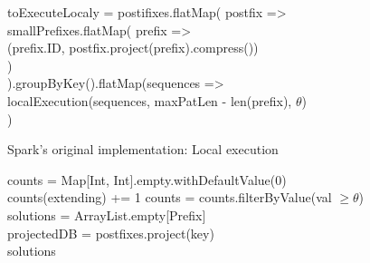 \documentclass{eplmastersthesis}
\begin{document}
\begin{algorithm}[h]
{{{{				} 
			}
		}
		 {
			toExecuteLocaly = postifixes.flatMap( postfix => \\
				\Indp
				smallPrefixes.flatMap( prefix => \\
					\Indp
					(prefix.ID, postfix.project(prefix).compress())\\
					\Indm
				)\\
				\Indm
			).groupByKey().flatMap(sequences => \\
				\Indp
				localExecution(sequences, maxPatLen - len(prefix), $\theta$) \\
				\Indm
			) \\
		}
   	}
\end{algorithm}

\LinesNumbered
\begin{algorithm}[h]
	\caption{Spark's original implementation: Local execution}
    \label{alg:SPARK3}
    
    
   	 {
   		counts = Map[Int, Int].empty.withDefaultValue(0) \\
		 {
			 {
				counts(extending) += 1
			}
		}
		counts = counts.filterByValue(val $\geq \theta$) \\
		solutions = ArrayList.empty[Prefix] \\
		 {
			projectedDB = postfixes.project(key)\\
		}
		\Return solutions
   	}
\end{algorithm}
\end{document}

